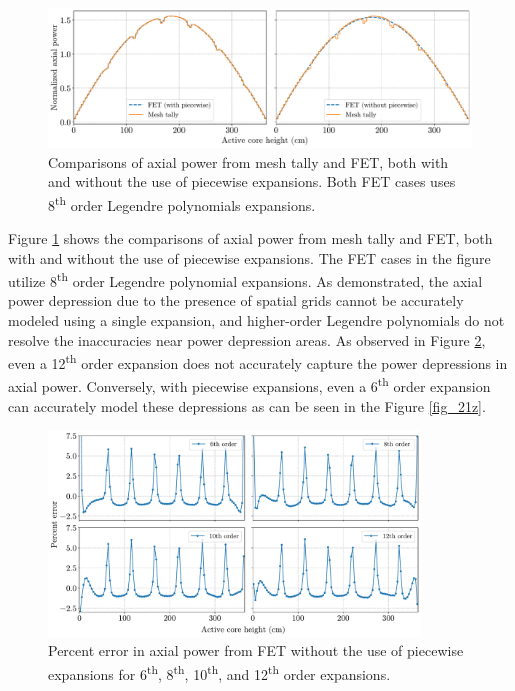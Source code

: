 \begin{figure}
    \centering
    \includegraphics[width=1.0\textwidth]{figs/axi_pow_comparison.pdf}
    \caption[Comparisons of axial power from mesh tally and FET.]{Comparisons of axial power from mesh tally and FET, both with and without the use of piecewise expansions. Both FET cases uses 8\textsuperscript{th} order Legendre polynomials expansions.}
    \label{fig_21x}
\end{figure}

Figure \ref{fig_21x} shows the comparisons of axial power from mesh tally and FET, both with and without the use of piecewise expansions. The FET cases in the figure utilize 8\textsuperscript{th} order Legendre polynomial expansions. As demonstrated, the axial power depression due to the presence of spatial grids cannot be accurately modeled using a single expansion, and higher-order Legendre polynomials do not resolve the inaccuracies near power depression areas. As observed in Figure \ref{fig_21y}, even a 12\textsuperscript{th} order expansion does not accurately capture the power depressions in axial power. Conversely, with piecewise expansions, even a 6\textsuperscript{th} order expansion can accurately model these depressions as can be seen in the Figure \ref{fig_21z}.

\begin{figure}
    \centering
    \includegraphics[width=0.88\textwidth]{figs/no_piecewise.pdf}
    \caption[Percent error in axial power from FET without the use of piecewise expansions.]{Percent error in axial power from FET without the use of piecewise expansions for 6\textsuperscript{th}, 8\textsuperscript{th}, 10\textsuperscript{th}, and 12\textsuperscript{th} order expansions.}
    \label{fig_21y}
\end{figure}

